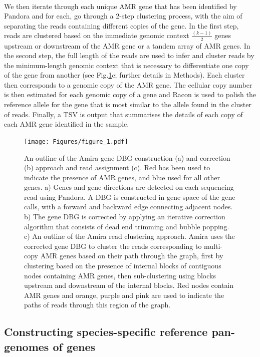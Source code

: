 \paragraph{}
We then iterate through each unique AMR gene that has been identified by Pandora and for each, go through a 2-step clustering process, with the aim of separating the reads containing different copies of the gene. In the first step, reads are clustered based on the immediate genomic context $\frac{(k-1)}{2}$ genes upstream or downstream of the AMR gene or a tandem array of AMR genes. In the second step, the full length of the reads are used to infer and cluster reads by the minimum-length genomic context that is necessary to differentiate one copy of the gene from another (see Fig.\ref{fig:1}c; further details in Methods). Each cluster then corresponds to a genomic copy of the AMR gene. The cellular copy number is then estimated for each genomic copy of a gene and Racon \cite{10.1101/gr.214270.116} is used to polish the reference allele for the gene that is most similar to the allele found in the cluster of reads. Finally, a TSV is output that summarises the details of each copy of each AMR gene identified in the sample.

\begin{figure}
\centering
\texttt{[image: Figures/figure\_1.pdf]}
\caption{An outline of the Amira gene DBG construction (a) and correction (b) approach and read assignment (c). Red has been used to indicate the presence of AMR genes, and blue used for all other genes. a) Genes and gene directions are detected on each sequencing read using Pandora. A DBG is constructed in gene space of the gene calls, with a forward and backward edge connecting adjacent nodes. b) The gene DBG is corrected by applying an iterative correction algorithm that consists of dead end trimming and bubble popping. c) An outline of the Amira read clustering approach. Amira uses the corrected gene DBG to cluster the reads corresponding to multi-copy AMR genes based on their path through the graph, first by clustering based on the presence of internal blocks of contiguous nodes containing AMR genes, then sub-clustering using blocks upstream and downstream of the internal blocks. Red nodes contain AMR genes and orange, purple and pink are used to indicate the paths of reads through this region of the graph.}
\label{fig:1}
\end{figure}

\subsection*{Constructing species-specific reference pan-genomes of genes}

